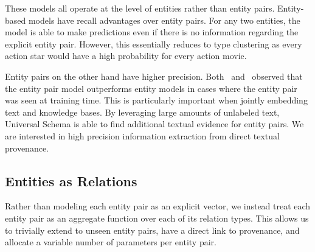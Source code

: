 These models all operate at the level of entities rather than entity pairs.
Entity-based models have recall advantages over entity pairs.
For any two entities, the model is able to make predictions even if there is no information regarding the explicit entity pair.
However, this essentially reduces to type clustering as every action star would have a high probability for every action movie.

Entity pairs on the other hand have higher precision.
Both~\citet{toutanova2015representing} and~\citet{limin} observed that the entity pair model outperforms entity models in cases where the entity pair was seen at training time.
This is particularly important when jointly embedding text and knowledge bases.
By leveraging large amounts of unlabeled text, Universal Schema is able to find additional textual evidence for entity pairs.
We are interested in high precision information extraction from direct textual provenance.


\subsection {Entities as Relations}

Rather than modeling each entity pair as an explicit vector, we instead treat each entity pair as an aggregate function over each of its relation types.
This allows us to trivially extend to unseen entity pairs, have a direct link to provenance, and allocate a variable number of parameters per entity pair.
